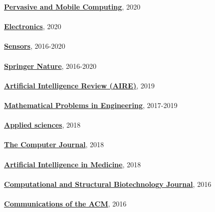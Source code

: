 \href{https://www.journals.elsevier.com/pervasive-and-mobile-computing}{\textbf{Pervasive and Mobile Computing}}, 2020
\\ \halfblankline \\
\href{https://www.mdpi.com/journal/electronics}{\textbf{Electronics}}, 2020
\\ \halfblankline \\
\href{http://www.mdpi.com/journal/sensors}{\textbf{Sensors}}, 2016-2020
\\ \halfblankline \\
\href{https://www.springernature.com/gp}{\textbf{Springer Nature}}, 2016-2020
\\ \halfblankline \\
\href{https://link.springer.com/journal/10462}{\textbf{Artificial Intelligence Review (AIRE)}}, 2019
\\ \halfblankline \\
\href{https://www.hindawi.com/journals/mpe/}{\textbf{Mathematical Problems in Engineering}}, 2017-2019
\\ \halfblankline \\
\href{http://www.mdpi.com/journal/applsci}{\textbf{Applied sciences}}, 2018
\\ \halfblankline \\
\href{https://academic.oup.com/comjnl}{\textbf{The Computer Journal}}, 2018
\\ \halfblankline \\
\href{https://www.journals.elsevier.com/artificial-intelligence-in-medicine/}{\textbf{Artificial Intelligence in Medicine}}, 2018
\\ \halfblankline \\
\href{https://www.journals.elsevier.com/computational-and-structural-biotechnology-journal/}{\textbf{Computational and Structural Biotechnology Journal}}, 2016
\\ \halfblankline \\
\href{http://cacm.acm.org/}{\textbf{Communications of the ACM}}, 2016
